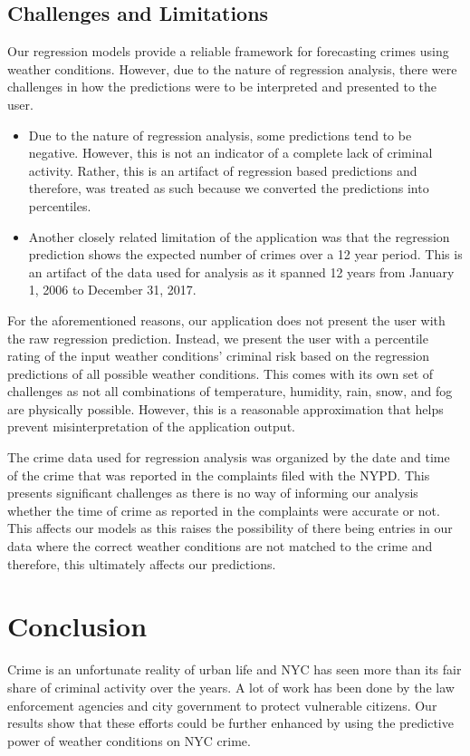 \documentclass[conference]{IEEEtran}
\begin{document}
\subsection{Challenges and Limitations}
Our regression models provide a reliable framework for forecasting crimes using weather conditions.
However, due to the nature of regression analysis, there were challenges in how the predictions were to be interpreted and presented to the user.
\begin{itemize}
    \item Due to the nature of regression analysis, some predictions tend to be negative.
    However, this is not an indicator of a complete lack of criminal activity.
    Rather, this is an artifact of regression based predictions and therefore, was treated as such because we converted the predictions into percentiles.
    \item Another closely related limitation of the application was that the regression prediction shows the expected number of crimes over a 12 year period.
    This is an artifact of the data used for analysis as it spanned 12 years from January 1, 2006 to December 31, 2017.
\end{itemize}
For the aforementioned reasons, our application does not present the user with the raw regression prediction.
Instead, we present the user with a percentile rating of the input weather conditions' criminal risk based on the regression predictions of all possible weather conditions.
This comes with its own set of challenges as not all combinations of temperature, humidity, rain, snow, and fog are physically possible.
However, this is a reasonable approximation that helps prevent misinterpretation of the application output.

The crime data used for regression analysis was organized by the date and time of the crime that was reported in the complaints filed with the NYPD.
This presents significant challenges as there is no way of informing our analysis whether the time of crime as reported in the complaints were accurate or not.
This affects our models as this raises the possibility of there being entries in our data where the correct weather conditions are not matched to the crime and therefore, this ultimately affects our predictions.

\section{Conclusion}
Crime is an unfortunate reality of urban life and NYC has seen more than its fair share of criminal activity over the years.
A lot of work has been done by the law enforcement agencies and city government to protect vulnerable citizens.
Our results show that these efforts could be further enhanced by using the predictive power of weather conditions on NYC crime.
\end{document}
